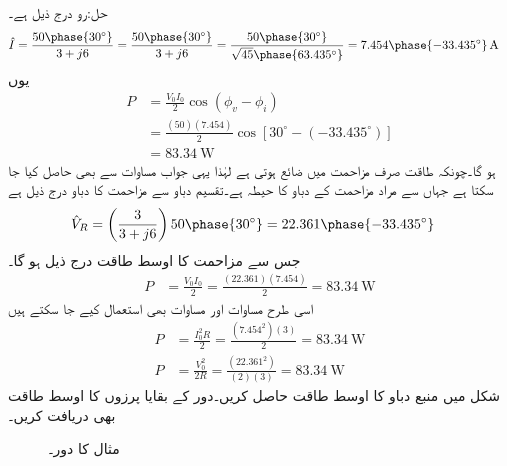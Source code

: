 حل:رو درج ذیل ہے۔
\begin{align*}
\hat{I}&=\frac{50\phase{30^{\circ}}}{3+j6}=\frac{50\phase{30^{\circ}}}{3+j6}=\frac{50\phase{30^{\circ}}}{\sqrt{45}\phase{63.435^{\circ}}}=7.454\phase{-33.435^{\circ}}\,\si{\ampere}
\end{align*}
یوں
\begin{align*}
P&=\frac{V_0 I_0}{2}\cos(\phi_v-\phi_i)\\
&=\frac{(50)(7.454)}{2}\cos[30^{\circ}-(-33.435^{\circ})]\\
&=\SI{83.34}{\watt}
\end{align*}
ہو گا۔چونکہ طاقت صرف مزاحمت میں ضائع ہوتی ہے لہٰذا یہی جواب مساوات  سے بھی حاصل کیا جا سکتا ہے جہاں  سے مراد مزاحمت کے دباو کا حیطہ ہے۔تقسیم دباو سے مزاحمت کا دباو درج ذیل ہے
\begin{align*}
\hat{V}_R&=\left(\frac{3}{3+j6}\right)50\phase{30^{\circ}}=22.361\phase{-33.435^{\circ}}
\end{align*}
جس سے مزاحمت کا اوسط طاقت درج ذیل ہو گا۔
\begin{align*}
P&=\frac{V_0 I_0}{2}=\frac{(22.361)(7.454)}{2}=\SI{83.34}{\watt}
\end{align*}
اسی طرح مساوات  اور مساوات  بھی استعمال کیے جا سکتے ہیں
\begin{align*}
P&=\frac{I^2_0 R}{2}=\frac{(7.454^2)(3)}{2}=\SI{83.34}{\watt}\\
P&=\frac{V^2_0}{2 R}=\frac{(22.361^2)}{(2)(3)}=\SI{83.34}{\watt}
\end{align*}
شکل  میں منبع دباو کا اوسط طاقت حاصل کریں۔دور کے بقایا پرزوں کا اوسط طاقت بھی دریافت کریں۔
\begin{figure}
\centering
{}
\caption{مثال  کا دور۔}
\label{شکل_طاقت_مزاحمت_امالہ_ب}
\end{figure} 

